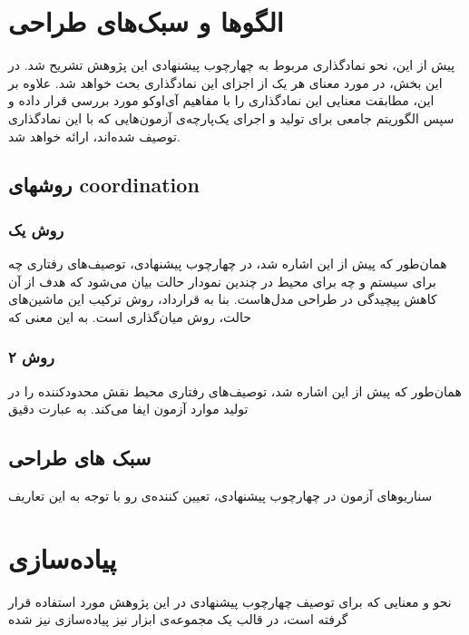 \section{الگوها و سبک‌های طراحی}
\label{section:extracted_patterns}
پیش از این، نحو نمادگذاری مربوط به چهارچوب پیشنهادی این پژوهش تشریح شد. در این بخش، در مورد معنای هر یک از اجزای این نمادگذاری بحث خواهد شد. علاوه بر این، مطابقت معنایی این نمادگذاری را با مفاهیم آی‌اوکو مورد بررسی قرار داده و سپس الگوریتم جامعی برای تولید و اجرای یک‌پارچه‌ی آزمون‌هایی که با این نمادگذاری توصیف شده‌اند، ارائه خواهد شد.

\subsection{روشهای coordination }

\subsubsection{روش یک}
همان‌طور که پیش از این اشاره شد،‌ در چهارچوب پیشنهادی، توصیف‌های رفتاری چه برای سیستم و چه برای محیط در چندین نمودار حالت بیان می‌شود که هدف از آن کاهش پیچیدگی در طراحی مدل‌هاست. بنا به قرارداد، روش ترکیب این ماشین‌های حالت، روش میان‌گذاری است. به این معنی که 
\subsubsection{روش ۲}
همان‌طور که پیش از این اشاره شد، توصیف‌های رفتاری محیط نقش محدود‌کننده را در تولید موارد آزمون ایفا می‌کند. به عبارت دقیق‌



\subsection{سبک های طراحی}
سناریو‌های آزمون در چهارچوب پیشنهادی، تعیین کننده‌‌ی رو
با توجه به این تعاریف



\section{پیاده‌سازی}
\label{section:asyncImpl}
نحو و معنایی که برای توصیف چهارچوب پیشنهادی در این پژوهش مورد استفاده قرار گرفته است، در قالب یک مجموعه‌ی ابزار نیز پیاده‌سازی نیز شده 
